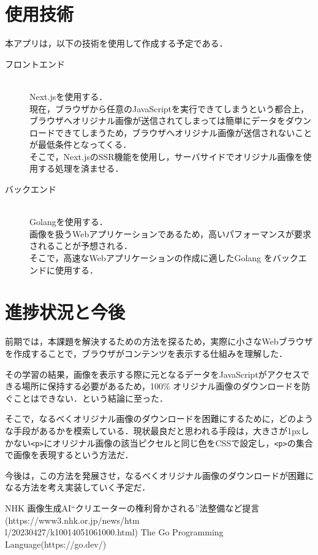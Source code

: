 ﻿\documentclass[twocolumn,a4j]{jarticle}
\begin{document}
\section{使用技術}
本アプリは，以下の技術を使用して作成する予定である．
\begin{description}
  \item[フロントエンド]\mbox{}\\
  Next.jsを使用する．\\
  現在，ブラウザから任意のJavaScriptを実行できてしまうという都合上，ブラウザへオリジナル画像が送信されてしまっては簡単にデータをダウンロードできてしまうため，ブラウザへオリジナル画像が送信されないことが最低条件となってくる．\\
  そこで，Next.jsのSSR機能を使用し，サーバサイドでオリジナル画像を使用する処理を済ませる．
  \item[バックエンド]\mbox{}\\
  Golangを使用する．\\
  画像を扱うWebアプリケーションであるため，高いパフォーマンスが要求されることが予想される．\\
  そこで，高速なWebアプリケーションの作成に適したGolang\cite{go} をバックエンドに使用する．
\end{description}


\section{進捗状況と今後}
前期では，本課題を解決するための方法を探るため，実際に小さなWebブラウザを作成することで，ブラウザがコンテンツを表示する仕組みを理解した．\par
その学習の結果，画像を表示する際に元となるデータをJavaScriptがアクセスできる場所に保持する必要があるため，100\% オリジナル画像のダウンロードを防ぐことはできない．という結論に至った．\par
そこで，なるべくオリジナル画像のダウンロードを困難にするために，どのような手段があるかを模索している．現状最良だと思われる手段は，大きさが1pxしかない\lstinline!<p>!にオリジナル画像の該当ピクセルと同じ色をCSSで設定し，\lstinline|<p>|の集合で画像を表現するという方法だ．\par
今後は，この方法を発展させ，なるべくオリジナル画像のダウンロードが困難になる方法を考え実装していく予定だ．


\begin{thebibliography}{9}\setlength{\itemsep}{-2pt}
   NHK 画像生成AI“クリエーターの権利脅かされる”法整備など提言(https://www3.nhk.or.jp/news/htm\\l/20230427/k10014051061000.html)
   The Go Programming Language(https://go.dev/)
\end{thebibliography}
\end{document}
